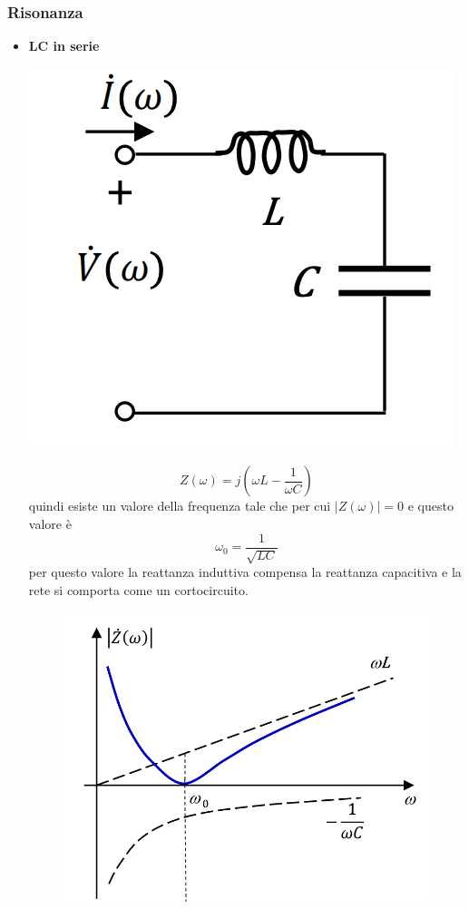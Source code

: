 \documentclass{article}
\theoremstyle{definition}
\begin{document}
\subsubsection{Risonanza}
\begin{itemize}
\item \textbf{LC in serie} 
\begin{center}
	\includegraphics[scale=0.35]{immagini/LC}
\end{center}
$$Z(\omega)=j(\omega L-\frac{1}{\omega C})$$  quindi esiste un valore della frequenza tale che per cui $|Z(\omega)|=0$ e questo valore è $$\omega_0=\frac{1}{\sqrt{LC}}$$ per questo valore la reattanza induttiva compensa la reattanza capacitiva e la rete si comporta come un cortocircuito.
\begin{figure}[h]
	\centering
	\includegraphics[scale=0.35]{immagini/1}

\end{figure}
\end{itemize}
\end{document}
